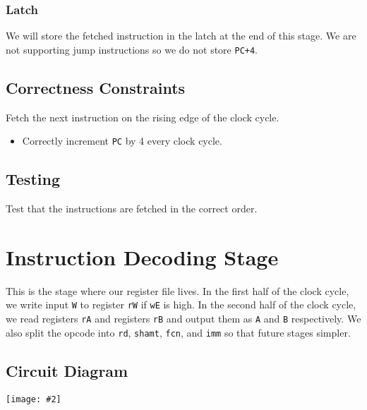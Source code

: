 \documentclass[10pt]{article}
\newcommand{\diagram}[2][1]{\begin{center}\texttt{[image: \#2]}\end{center}}
\begin{document}
\subsubsection{Latch}
We will store the fetched instruction in the latch at the end of this stage. We are not supporting jump instructions so we do not store \texttt{PC+4}.

\subsection{Correctness Constraints}
Fetch the next instruction on the rising edge of the clock cycle. 
\begin{itemize}
\item Correctly increment \texttt{PC} by 4 every clock cycle.
\end{itemize}

\subsection{Testing}
Test that the instructions are fetched in the correct order.

\section{Instruction Decoding Stage}
This is the stage where our register file lives. In the first half of the clock cycle, we write input \texttt{W} to register \texttt{rW} if \texttt{wE} is high. 
In the second half of the clock cycle, we read registers \texttt{rA} and registers \texttt{rB} and output them as \texttt{A} and \texttt{B} respectively.
We also split the opcode into \texttt{rd}, \texttt{shamt}, \texttt{fcn}, and \texttt{imm} so that future stages simpler. 
\subsection{Circuit Diagram}
\diagram[0.8]{decode}
\end{document}
